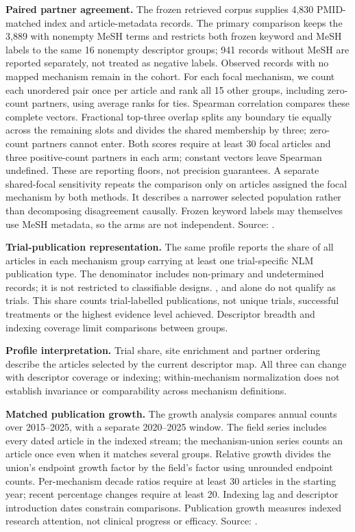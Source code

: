 \documentclass[11pt,twoside,openright]{report}
\begin{document}
\textbf{Paired partner agreement.} The frozen retrieved corpus supplies 4,830 PMID-matched index and article-metadata records. The primary comparison keeps the 3,889 with nonempty MeSH terms and restricts both frozen keyword and MeSH labels to the same 16 nonempty descriptor groups; 941 records without MeSH are reported separately, not treated as negative labels. Observed records with no mapped mechanism remain in the cohort. For each focal mechanism, we count each unordered pair once per article and rank all 15 other groups, including zero-count partners, using average ranks for ties. Spearman correlation compares these complete vectors. Fractional top-three overlap splits any boundary tie equally across the remaining slots and divides the shared membership by three; zero-count partners cannot enter. Both scores require at least 30 focal articles and three positive-count partners in each arm; constant vectors leave Spearman undefined. These are reporting floors, not precision guarantees. A separate shared-focal sensitivity repeats the comparison only on articles assigned the focal mechanism by both methods. It describes a narrower selected population rather than decomposing disagreement causally. Frozen keyword labels may themselves use MeSH metadata, so the arms are not independent. Source: .

\textbf{Trial-publication representation.} The same profile reports the share of all articles in each mechanism group carrying at least one trial-specific NLM publication type. The denominator includes non-primary and undetermined records; it is not restricted to classifiable designs. ,  and  alone do not qualify as trials. This share counts trial-labelled publications, not unique trials, successful treatments or the highest evidence level achieved. Descriptor breadth and indexing coverage limit comparisons between groups.

\textbf{Profile interpretation.} Trial share, site enrichment and partner ordering describe the articles selected by the current descriptor map. All three can change with descriptor coverage or indexing; within-mechanism normalization does not establish invariance or comparability across mechanism definitions.

\textbf{Matched publication growth.} The growth analysis compares annual counts over 2015–2025, with a separate 2020–2025 window. The field series includes every dated article in the indexed stream; the mechanism-union series counts an article once even when it matches several groups. Relative growth divides the union's endpoint growth factor by the field's factor using unrounded endpoint counts. Per-mechanism decade ratios require at least 30 articles in the starting year; recent percentage changes require at least 20. Indexing lag and descriptor introduction dates constrain comparisons. Publication growth measures indexed research attention, not clinical progress or efficacy. Source: .
\end{document}
